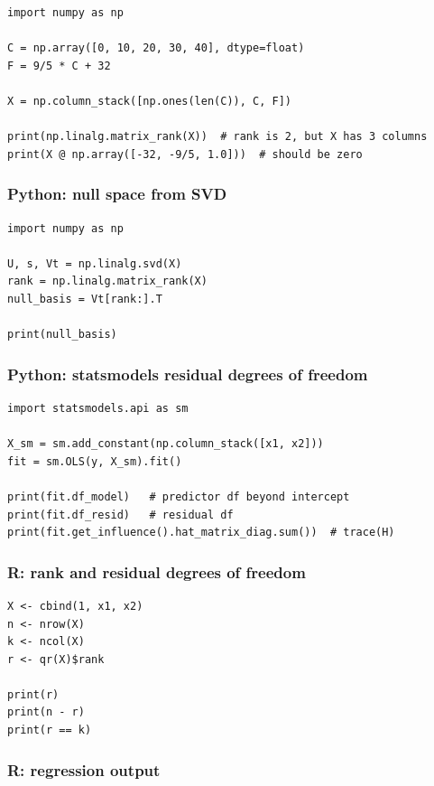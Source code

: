 \begin{verbatim}
import numpy as np

C = np.array([0, 10, 20, 30, 40], dtype=float)
F = 9/5 * C + 32

X = np.column_stack([np.ones(len(C)), C, F])

print(np.linalg.matrix_rank(X))  # rank is 2, but X has 3 columns
print(X @ np.array([-32, -9/5, 1.0]))  # should be zero
\end{verbatim}

\subsubsection*{Python: null space from SVD}

\begin{verbatim}
import numpy as np

U, s, Vt = np.linalg.svd(X)
rank = np.linalg.matrix_rank(X)
null_basis = Vt[rank:].T

print(null_basis)
\end{verbatim}

\subsubsection*{Python: statsmodels residual degrees of freedom}

\begin{verbatim}
import statsmodels.api as sm

X_sm = sm.add_constant(np.column_stack([x1, x2]))
fit = sm.OLS(y, X_sm).fit()

print(fit.df_model)   # predictor df beyond intercept
print(fit.df_resid)   # residual df
print(fit.get_influence().hat_matrix_diag.sum())  # trace(H)
\end{verbatim}

\subsubsection*{R: rank and residual degrees of freedom}

\begin{verbatim}
X <- cbind(1, x1, x2)
n <- nrow(X)
k <- ncol(X)
r <- qr(X)$rank

print(r)
print(n - r)
print(r == k)
\end{verbatim}

\subsubsection*{R: regression output}

